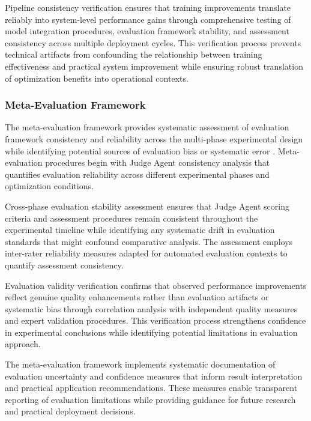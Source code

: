 Pipeline consistency verification ensures that training improvements translate reliably into system-level performance gains through comprehensive testing of model integration procedures, evaluation framework stability, and assessment consistency across multiple deployment cycles. This verification process prevents technical artifacts from confounding the relationship between training effectiveness and practical system improvement while ensuring robust translation of optimization benefits into operational contexts.

\subsubsection{Meta-Evaluation Framework}

The meta-evaluation framework provides systematic assessment of evaluation framework consistency and reliability across the multi-phase experimental design while identifying potential sources of evaluation bias or systematic error \cite{wang2024dynamic_evaluation}. Meta-evaluation procedures begin with Judge Agent consistency analysis that quantifies evaluation reliability across different experimental phases and optimization conditions.

Cross-phase evaluation stability assessment ensures that Judge Agent scoring criteria and assessment procedures remain consistent throughout the experimental timeline while identifying any systematic drift in evaluation standards that might confound comparative analysis. The assessment employs inter-rater reliability measures adapted for automated evaluation contexts to quantify assessment consistency.

Evaluation validity verification confirms that observed performance improvements reflect genuine quality enhancements rather than evaluation artifacts or systematic bias through correlation analysis with independent quality measures and expert validation procedures. This verification process strengthens confidence in experimental conclusions while identifying potential limitations in evaluation approach.

The meta-evaluation framework implements systematic documentation of evaluation uncertainty and confidence measures that inform result interpretation and practical application recommendations. These measures enable transparent reporting of evaluation limitations while providing guidance for future research and practical deployment decisions.

